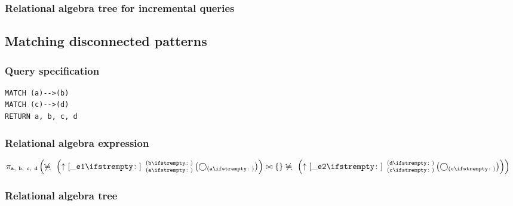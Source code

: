 \subsubsection*{Relational algebra tree for incremental queries}


\subsection{Matching disconnected patterns}

\subsubsection*{Query specification}

\begin{lstlisting}
MATCH (a)-->(b)
MATCH (c)-->(d)
RETURN a, b, c, d
\end{lstlisting}

\subsubsection*{Relational algebra expression}

$\projection{\var{a},~\var{b},~\var{c},~\var{d}} \left(\alldifferent{} \left(\expandout{\_e1}{}{a}{b}{} \left(\getvertices{a}{}\right)\right) \join \{\} \alldifferent{} \left(\expandout{\_e2}{}{c}{d}{} \left(\getvertices{c}{}\right)\right)\right)$

\subsubsection*{Relational algebra tree}


